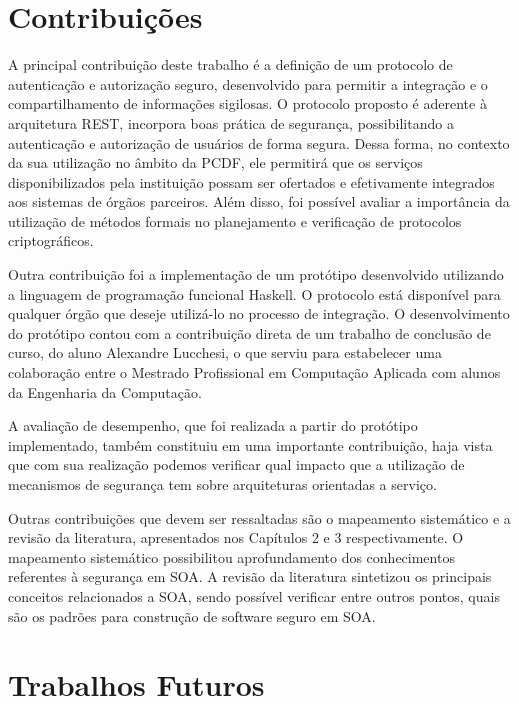 \section{Contribuições}
A principal contribuição deste trabalho é a definição de um protocolo de autenticação e autorização seguro, desenvolvido para permitir a integração e o compartilhamento de informações sigilosas. O protocolo proposto é aderente à arquitetura REST, incorpora boas prática de segurança, possibilitando a autenticação e autorização de usuários de forma segura. Dessa forma, no contexto da sua utilização no âmbito da PCDF, ele permitirá que os serviços disponibilizados pela instituição possam ser ofertados e efetivamente integrados aos sistemas de órgãos parceiros. Além disso, foi possível avaliar a importância da utilização de métodos formais no planejamento e verificação de protocolos criptográficos. %

Outra contribuição foi a implementação de um protótipo desenvolvido utilizando a linguagem de programação funcional Haskell. O protocolo está disponível para qualquer órgão que deseje utilizá-lo no processo de integração. O desenvolvimento do protótipo contou com a contribuição direta de um trabalho de conclusão de curso, do aluno Alexandre Lucchesi, o que serviu para estabelecer uma colaboração entre o Mestrado Profissional em Computação Aplicada com alunos da Engenharia da Computação.

A avaliação de desempenho, que foi realizada a partir do protótipo implementado, também constituiu em uma importante contribuição, haja vista que com sua realização podemos verificar qual impacto que a utilização de mecanismos de segurança tem sobre arquiteturas orientadas a serviço.

Outras contribuições que devem ser ressaltadas são o mapeamento sistemático e a  revisão da literatura, apresentados nos Capítulos 2 e 3 respectivamente. O mapeamento sistemático possibilitou aprofundamento dos conhecimentos referentes à segurança em SOA.  A revisão da literatura sintetizou os principais conceitos relacionados a SOA, sendo possível verificar entre outros pontos, quais são os padrões para construção de software seguro em SOA.



\section{Trabalhos Futuros}

